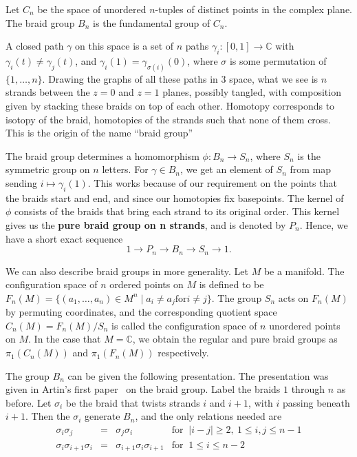 \documentclass[12pt]{article}
\begin{document}
Let $C_n$ be the space of unordered $n$-tuples of distinct points in the complex plane.  The braid group $B_n$ is the fundamental group of $C_n$.

A closed path $\gamma$ on this space is a set of $n$ paths $\gamma_i:[0,1]\to\mathbb{C}$ with $\gamma_i(t)\neq\gamma_j(t)$, and $\gamma_i(1)=\gamma_{\sigma(i)}(0)$, where $\sigma$ is some permutation of $\{1,\ldots,n\}$.  Drawing the graphs of all these paths in 3 space, what we see is $n$ strands between the $z=0$ and $z=1$ planes, possibly tangled, with composition given by stacking these braids on top of each other.  Homotopy corresponds to isotopy of the braid, homotopies of the strands such that none of them cross.  This is the origin of the name ``braid group''

The braid group determines a homomorphism $\phi : B_n \to S_n$, where $S_n$ is the symmetric group on $n$ letters. For $\gamma \in B_n$, we get an element of $S_n$ from map sending $i \mapsto \gamma_i(1)$. This works because of our requirement on the points that the braids start and end, and since our homotopies fix basepoints. The kernel of $\phi$ consists of the braids that bring each strand to its original order. This kernel gives us the \textbf{pure braid group on n strands}, and is denoted by $P_n$. Hence, we have a short exact sequence
\[ 1 \to P_n \to B_n \to S_n \to 1. \]

We can also describe braid groups in more generality. Let $M$ be a manifold. The configuration space of $n$ ordered points on $M$ is defined to be $F_n(M) = \{(a_1,\ldots,a_n) \in M^n \mid a_i \neq a_j \mbox{for} i \neq j\}$. The group $S_n$ acts on $F_n(M)$ by permuting coordinates, and the corresponding quotient space $C_n(M) = F_n(M) / S_n$ is called the configuration space of $n$ unordered points on $M$. In the case that $M = \mathbb{C}$, we obtain the regular and pure braid groups as $\pi_1(C_n(M))$ and $\pi_1(F_n(M))$ respectively.

The group $B_n$ can be given the following presentation. The presentation was given in Artin's first paper~\cite{Artin} on the braid group. Label the braids $1$ through $n$ as before. Let $\sigma_i$ be the braid that twists strands $i$ and $i+1$, with $i$ passing beneath $i+1$. Then the $\sigma_i$ generate $B_n$, and the only relations needed are
\[
\begin{array}{cccl}
\sigma_i \sigma_j & = & \sigma_j \sigma_i & \mbox{for } \: |i - j| \geq 2 , \: 1 \leq i,j \leq n-1 \\
\sigma_i \sigma_{i+1} \sigma_i & = & \sigma_{i+1} \sigma_i \sigma_{i+1} & \mbox{for } \: 1 \leq i \leq n-2\\
\end{array}
\]
\end{document}
